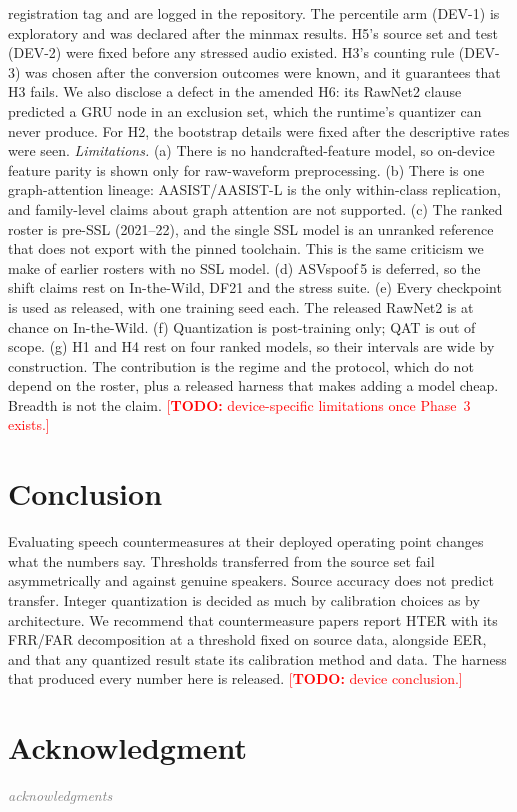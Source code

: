 \documentclass[journal]{IEEEtran}
\newcommand{\todo}[1]{\textcolor{red}{[\textbf{TODO:} #1]}}
\newcommand{\placeholder}[1]{\textcolor{gray}{\emph{#1}}}
\begin{document}
registration tag and are logged in the repository. The percentile arm (DEV-1)
is exploratory and was declared after the minmax results. H5's source set and
test (DEV-2) were fixed before any stressed audio existed. H3's counting rule
(DEV-3) was chosen after the conversion outcomes were known, and it guarantees
that H3 fails. We also disclose a defect in the amended H6: its RawNet2 clause
predicted a GRU node in an exclusion set, which the runtime's quantizer can
never produce. For H2, the bootstrap details were fixed after the descriptive
rates were seen.
\emph{Limitations.} (a) There is no handcrafted-feature model, so on-device
feature parity is shown only for raw-waveform preprocessing. (b) There is one
graph-attention lineage: AASIST/AASIST-L is the only within-class replication,
and family-level claims about graph attention are not supported. (c) The ranked
roster is pre-SSL (2021--22), and the single SSL model is an unranked reference
that does not export with the pinned toolchain. This is the same criticism we
make of earlier rosters with no SSL model. (d) ASVspoof\,5 is deferred, so the
shift claims rest on In-the-Wild, DF21 and the stress suite. (e) Every
checkpoint is used as released, with one training seed each. The released
RawNet2 is at chance on In-the-Wild. (f) Quantization is post-training only;
QAT is out of scope. (g) H1 and H4 rest on four ranked models, so their
intervals are wide by construction.
The contribution is the regime and the protocol, which do not depend on the
roster, plus a released harness that makes adding a model cheap. Breadth is not
the claim. \todo{device-specific limitations once Phase~3 exists.}

\section{Conclusion}
\label{sec:conclusion}
Evaluating speech countermeasures at their deployed operating point changes
what the numbers say. Thresholds transferred from the source set fail
asymmetrically and against genuine speakers. Source accuracy does not predict
transfer. Integer quantization is decided as much by calibration choices as by
architecture. We recommend that countermeasure papers report HTER with its
FRR/FAR decomposition at a threshold fixed on source data, alongside EER, and
that any quantized result state its calibration method and data. The harness
that produced every number here is released. \todo{device conclusion.}

\section*{Acknowledgment}
\placeholder{acknowledgments}




\end{document}
